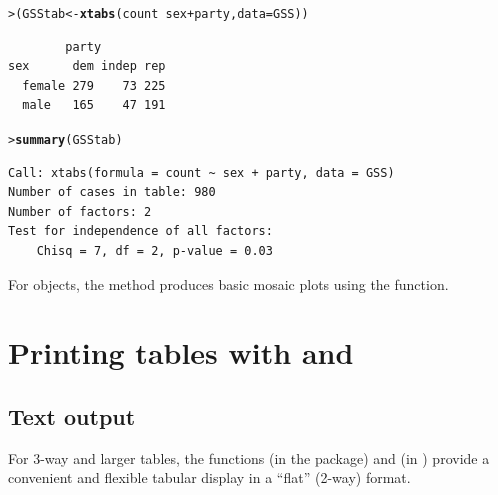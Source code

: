 \documentclass[10pt,krantz2]{krantz}\usepackage[]{graphicx}\usepackage[]{color}
\makeatletter
\newcommand{\hlopt}[1]{\textcolor[rgb]{0,0,0}{#1}}%
\newcommand{\hlstd}[1]{\textcolor[rgb]{0.345,0.345,0.345}{#1}}%
\newcommand{\hlkwb}[1]{\textcolor[rgb]{0.69,0.353,0.396}{#1}}%
\newcommand{\hlkwc}[1]{\textcolor[rgb]{0.333,0.667,0.333}{#1}}%
\newcommand{\hlkwd}[1]{\textcolor[rgb]{0.737,0.353,0.396}{\textbf{#1}}}%
\newenvironment{kframe}{%
 \def\at@end@of@kframe{}%
 \ifinner\ifhmode%
  \def\at@end@of@kframe{\end{minipage}}%
  \begin{minipage}{\columnwidth}%
 \fi\fi%
 \def\FrameCommand##1{\hskip\@totalleftmargin \hskip-\fboxsep
 \colorbox{shadecolor}{##1}\hskip-\fboxsep
     \hskip-\linewidth \hskip-\@totalleftmargin \hskip\columnwidth}%
 \MakeFramed {\advance\hsize-\width
   \@totalleftmargin\z@ \linewidth\hsize
   \@setminipage}}%
 {\par\unskip\endMakeFramed%
 \at@end@of@kframe}
\newenvironment{knitrout}{}{} %
\renewenvironment{knitrout}{\small\renewcommand{\baselinestretch}{.85}}{} %
\makeatother
\begin{document}
\begin{knitrout}
\color{fgcolor}\begin{kframe}
\begin{alltt}
\hlstd{> }\hlstd{(GSStab} \hlkwb{<-} \hlkwd{xtabs}\hlstd{(count} \hlopt{~} \hlstd{sex} \hlopt{+} \hlstd{party,} \hlkwc{data} \hlstd{= GSS))}
\end{alltt}
\begin{verbatim}
        party
sex      dem indep rep
  female 279    73 225
  male   165    47 191
\end{verbatim}
\begin{alltt}
\hlstd{> }\hlkwd{summary}\hlstd{(GSStab)}
\end{alltt}
\begin{verbatim}
Call: xtabs(formula = count ~ sex + party, data = GSS)
Number of cases in table: 980 
Number of factors: 2 
Test for independence of all factors:
	Chisq = 7, df = 2, p-value = 0.03
\end{verbatim}
\end{kframe}
\end{knitrout}

For  objects, the  method produces basic mosaic plots
using the  function. 



\section[Printing tables: structable and ftable]{Printing tables with  and }\label{sec:structable}

\subsection{Text output}

For 3-way and larger tables, the functions
 (in the  package) and
 (in ) provide a convenient and flexible tabular display in a ``flat'' (2-way) format.
\end{document}
